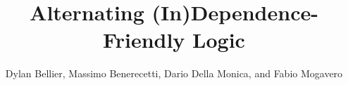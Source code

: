 \documentclass[authoryear]{elsarticle}
\begin{document}
  \title{Alternating (In)Dependence-Friendly Logic}
  \author{Dylan Bellier, Massimo Benerecetti, Dario Della Monica, and
    Fabio Mogavero}




\end{document}
